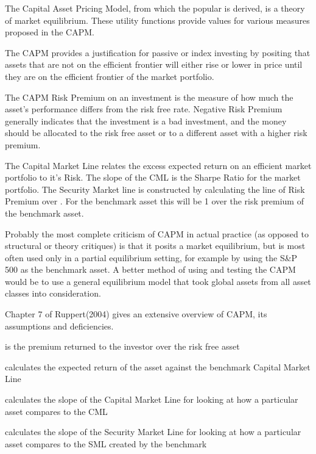 \documentclass[12pt,letterpaper,english]{article}
\begin{document}
\begin{Description}\relax
The Capital Asset Pricing Model, from which the popular  is derived, is a theory of market equilibrium.
These utility functions provide values for various measures proposed in the CAPM.
\end{Description}
\begin{Details}\relax
The CAPM provides a justification for passive or index investing by positing that assets that are not on the efficient frontier will either rise or lower in price until they are on the efficient frontier of the market portfolio.

The CAPM Risk Premium on an investment is the measure of how much the asset's performance differs from the risk free rate.  Negative Risk Premium generally indicates that the investment is a bad investment, and the money should be allocated to the risk free asset or to a different asset with a higher risk premium.

The Capital Market Line relates the excess expected return on an efficient market portfolio to it's Risk.  The slope of the CML is the Sharpe Ratio for the market portfolio. The Security Market line is constructed by calculating the line of Risk Premium over .  For the benchmark asset this will be 1 over the risk premium of the benchmark asset.

Probably the most complete criticism of CAPM in actual practice (as opposed to structural or theory critiques) is that it posits a market equilibrium, but is most often used only in a partial equilibrium setting, for example by using the S\&P 500 as the benchmark asset.  A better method of using and testing the CAPM would be to use a general equilibrium model that took global assets from all asset classes into consideration.

Chapter 7 of Ruppert(2004) gives an extensive overview of CAPM, its assumptions and deficiencies.

 is the premium returned to the investor over the risk free asset


 calculates the expected return of the asset against the benchmark Capital Market Line

 calculates the slope of the Capital Market Line for looking at how a particular asset compares to the CML

 calculates the slope of the Security Market Line for looking at how a particular asset compares to the SML created by the benchmark
\end{Details}
\end{document}
